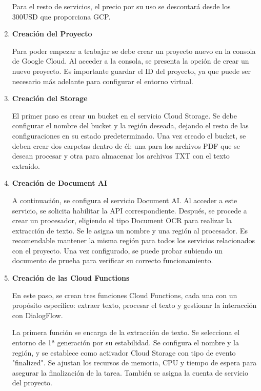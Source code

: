 \begin{enumerate}
    Para el resto de servicios, el precio por su uso se descontará desde los 300USD que proporciona GCP.


\item \textbf{Creación del Proyecto}

Para poder empezar a trabajar se debe crear un proyecto nuevo en la consola de Google Cloud. Al acceder a la consola, se presenta la opción de crear un nuevo proyecto. Es importante guardar el ID del proyecto, ya que puede ser necesario más adelante para configurar el entorno virtual.

\item \textbf{Creación del Storage}

El primer paso es crear un bucket en el servicio Cloud Storage. Se debe configurar el nombre del bucket y la región deseada, dejando el resto de las configuraciones en su estado predeterminado. Una vez creado el bucket, se deben crear dos carpetas dentro de él: una para los archivos PDF que se desean procesar y otra para almacenar los archivos TXT con el texto extraído.

\item \textbf{ Creación de Document AI}

A continuación, se configura el servicio Document AI. Al acceder a este servicio, se solicita habilitar la API correspondiente. Después, se procede a crear un procesador, eligiendo el tipo Document OCR para realizar la extracción de texto. Se le asigna un nombre y una región al procesador. Es recomendable mantener la misma región para todos los servicios relacionados con el proyecto. Una vez configurado, se puede probar subiendo un documento de prueba para verificar su correcto funcionamiento.

\item \textbf{Creación de las Cloud Functions}

En este paso, se crean tres funciones Cloud Functions, cada una con un propósito específico: extraer texto, procesar el texto y gestionar la interacción con DialogFlow.

La primera función se encarga de la extracción de texto. Se selecciona el entorno de 1ª generación por su estabilidad. Se configura el nombre y la región, y se establece como activador Cloud Storage con tipo de evento "finalized". Se ajustan los recursos de memoria, CPU y tiempo de espera para asegurar la finalización de la tarea. También se asigna la cuenta de servicio del proyecto.


\end{enumerate}
